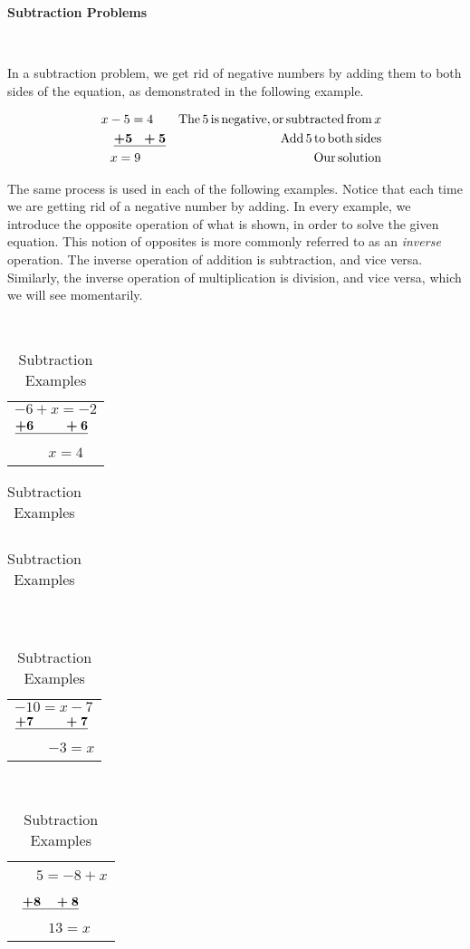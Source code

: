 
{\textbf{Subtraction Problems}}\par
~\par
In a subtraction problem, we get rid of negative numbers by adding them to
both sides of the equation, as demonstrated in the following example.

\begin{example}\label{Lin6}
  \begin{eqnarray*}
    x - 5 = 4~~~ &  & \operatorname{The} 5 \operatorname{is} \operatorname{negative}, \operatorname{or}
    \operatorname{subtracted} \operatorname{from} x\\
    ~~~~~~\boldsymbol{\underline{+ 5 ~~+ 5}} &  & \operatorname{Add} 5 \operatorname{to} \operatorname{both}
    \operatorname{sides}\\
    x = 9\qquad  &  & \operatorname{Our} \operatorname{solution}
  \end{eqnarray*}
\end{example}

The same process is used in each of the following examples. Notice that each time we are getting rid of a negative
number by adding.\pp
In every example, we introduce the opposite operation of what is shown, in order to solve the given equation.  This notion of opposites is more commonly referred to as an \textit{inverse} operation.  The inverse operation of addition is subtraction, and vice versa.  Similarly, the inverse operation of multiplication is division, and vice versa, which we will see momentarily.

\begin{example}\label{Lin7}
~\end{example}

  \begin{table}[h]
    \begin{tabular}{l}
      $- 6 + x = - 2$\\
      $\boldsymbol{\underline{+ 6 ~~~~~~~+ 6}}$\\
      ~~~~ $x = 4$
    \end{tabular} \begin{tabular}{l}
      
    \end{tabular}\begin{tabular}{l}
      
    \end{tabular} \ \ \ \ \ \ \ \ \ \ \ \ \ \ \ \ \ \ \begin{tabular}{l}
      $- 10 = x - 7$\\
      $ \boldsymbol{\underline{+ 7 ~~~~~~~+ 7}}$\\
      ~~~~ $- 3 = x$
    \end{tabular} \ \ \ \ \ \ \ \ \ \ \ \ \ \ \ \ \ \ \ \begin{tabular}{l}
      ~~~$5 = - 8 + x$\\
      ~$\boldsymbol{\underline{+ 8 ~~~+ 8}}$\\
      ~~~~ $13 = x$
    \end{tabular}
    \caption{Subtraction Examples}
  \end{table}

